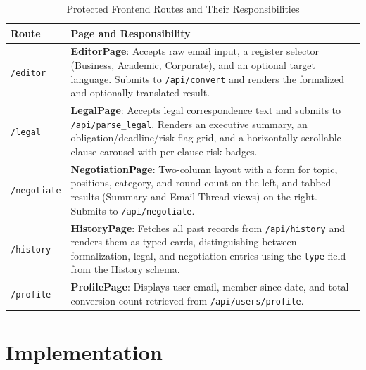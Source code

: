 \documentclass[12pt,a4paper]{report}
\begin{document}
\begin{table}[ht]
	\centering
	\renewcommand{\arraystretch}{1.4}
	\begin{tabularx}{\textwidth}{lX}
		\toprule
		\textbf{Route}      & \textbf{Page and Responsibility}                                                                                                                                                                                                                 \\
		\midrule
		\texttt{/editor}    & \textbf{EditorPage}: Accepts raw email input, a register selector (Business, Academic, Corporate), and an optional target language. Submits to \texttt{/api/convert} and renders the formalized and optionally translated result.                \\
		\texttt{/legal}     & \textbf{LegalPage}: Accepts legal correspondence text and submits to \texttt{/api/parse\_legal}. Renders an executive summary, an obligation/deadline/risk-flag grid, and a horizontally scrollable clause carousel with per-clause risk badges. \\
		\texttt{/negotiate} & \textbf{NegotiationPage}: Two-column layout with a form for topic, positions, category, and round count on the left, and tabbed results (Summary and Email Thread views) on the right. Submits to \texttt{/api/negotiate}.                       \\
		\texttt{/history}   & \textbf{HistoryPage}: Fetches all past records from \texttt{/api/history} and renders them as typed cards, distinguishing between formalization, legal, and negotiation entries using the \texttt{type} field from the History schema.           \\
		\texttt{/profile}   & \textbf{ProfilePage}: Displays user email, member-since date, and total conversion count retrieved from \texttt{/api/users/profile}.                                                                                                             \\
		\bottomrule
	\end{tabularx}
	\caption{Protected Frontend Routes and Their Responsibilities}
\end{table}

\chapter{Implementation}
\end{document}
